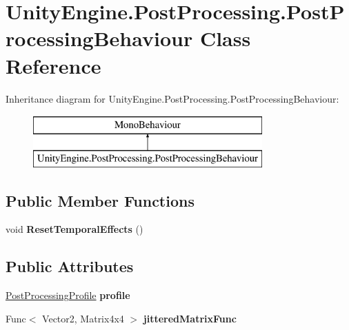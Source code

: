 \hypertarget{class_unity_engine_1_1_post_processing_1_1_post_processing_behaviour}{}\section{Unity\+Engine.\+Post\+Processing.\+Post\+Processing\+Behaviour Class Reference}
\label{class_unity_engine_1_1_post_processing_1_1_post_processing_behaviour}
Inheritance diagram for Unity\+Engine.\+Post\+Processing.\+Post\+Processing\+Behaviour\+:\begin{figure}[H]
\begin{center}
\leavevmode
\includegraphics[height=2.000000cm]{class_unity_engine_1_1_post_processing_1_1_post_processing_behaviour}
\end{center}
\end{figure}
\subsection*{Public Member Functions}
\begin{DoxyCompactItemize}
\item 
\mbox{\label{class_unity_engine_1_1_post_processing_1_1_post_processing_behaviour_a12cc91b85fedc39bf7d777a2c4d49f17}} 
void {\bfseries Reset\+Temporal\+Effects} ()
\end{DoxyCompactItemize}
\subsection*{Public Attributes}
\begin{DoxyCompactItemize}
\item 
\mbox{\label{class_unity_engine_1_1_post_processing_1_1_post_processing_behaviour_a34c4569526dd0e87af574653c99ab1db}} 
\hyperlink{class_unity_engine_1_1_post_processing_1_1_post_processing_profile}{Post\+Processing\+Profile} {\bfseries profile}
\item 
\mbox{\label{class_unity_engine_1_1_post_processing_1_1_post_processing_behaviour_a8cd98b27f5b575670763aeca458e2547}} 
Func$<$ Vector2, Matrix4x4 $>$ {\bfseries jittered\+Matrix\+Func}
\end{DoxyCompactItemize}

